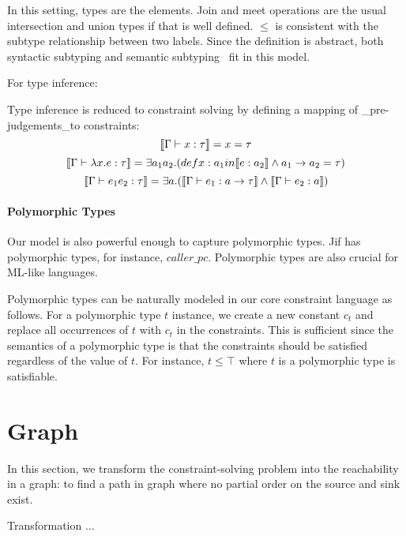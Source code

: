In this setting, types are the elements. Join and
meet operations are the usual intersection and union types if that is
well defined.
$\leq$ is consistent with the subtype relationship between two labels.
Since the definition is abstract, both syntactic subtyping 
and semantic subtyping~\cite{aiken-typeinclusion} fit in this model.

For type inference:

Type inference is reduced to constraint solving by defining a mapping
of _pre-judgements_to constraints:
\[\llbracket \Gamma \vdash x:\tau \rrbracket = x =\tau\]
\[\llbracket \Gamma \vdash \lambda x.e:\tau \rrbracket = \exists a_1 a_2.
(def x: a_1 in \llbracket e:a_2 \rrbracket \land a_1 \rightarrow a_2 =\tau)\]
\[\llbracket \Gamma\vdash e_1 e_2 : \tau \rrbracket = \exists a.(\llbracket \Gamma \vdash
e_1:a\rightarrow \tau \rrbracket\land \llbracket \Gamma\vdash e_2:a \rrbracket)\]


\paragraph{Polymorphic Types}

Our model is also powerful enough to capture polymorphic types.  Jif
has polymorphic types, for instance, $caller\_pc$. Polymorphic types
are also crucial for ML-like languages.

Polymorphic types can be naturally modeled in our core constraint
language as follows. For a polymorphic type $t$ instance, we create a
new constant $c_t$ and replace all occurrences of $t$ with $c_t$ in
the constraints. This is sufficient since the semantics of a
polymorphic type is that the constraints should be satisfied
regardless of the value of $t$. For instance, $t\leq \top$ where $t$
is a polymorphic type is satisfiable.

\section{Graph} 
\label{sec:graph}

In this section, we transform the constraint-solving problem into the
reachability in a graph: to find a path in graph where no partial order on the
source and sink exist. 

Transformation ... 

